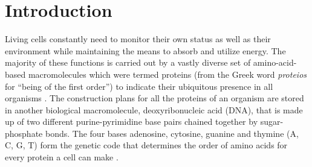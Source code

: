 \chapter{Introduction} %

\label{Body} %

\fancyfoot[C]{\thepage}

Living cells constantly need to monitor their own status as well as their environment while maintaining the means to absorb and utilize energy. The majority of these functions is carried out by a vastly diverse set of amino-acid-based macromolecules which were termed proteins (from the Greek word \textit{proteios} for ``being of the first order'') to indicate their ubiquitous presence in all organisms \citep{Vickery1950}. The construction plans for all the proteins of an organism are stored in another biological macromolecule, deoxyribonucleic acid (DNA), that is made up of two different purine-pyrimidine base pairs chained together by sugar-phosphate bonds. The four bases adenosine, cytosine, guanine and thymine (A, C, G, T) form the genetic code that determines the order of amino acids for every protein a cell can make \citep{Campbell2003}.

